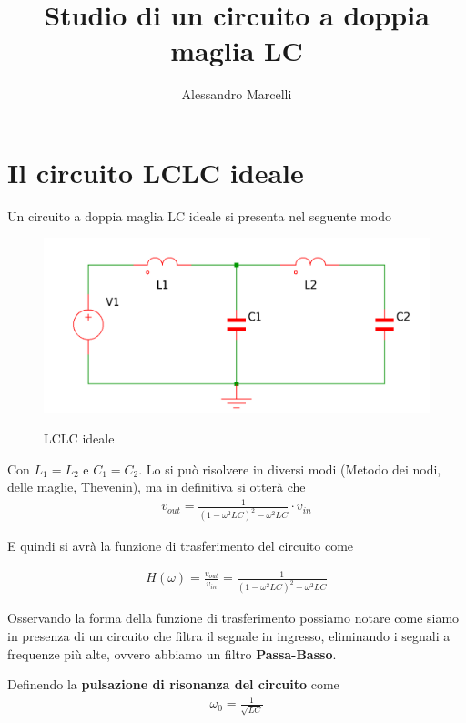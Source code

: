 \documentclass[a4paper,12pt]{report}
\title{Studio di un circuito a doppia maglia LC}
\author{Alessandro Marcelli}
\begin{document}
\maketitle
\tableofcontents
\begin{abstract}
\end{abstract}

\section{Il circuito LCLC ideale}
Un circuito a doppia maglia LC ideale si presenta nel seguente modo
\begin{figure}[!htb]
	\centering
	\includegraphics[width=\textwidth]{pictures/schemaideale.png}
	\label{fig:largenenough}
	\caption{\label{lul} \small LCLC ideale}
\end{figure}

Con $L_1 = L_2$ e $C_1 = C_2$. Lo si può risolvere in diversi modi (Metodo dei nodi, delle maglie, Thevenin), ma in definitiva si otterà che
\begin{align}
v_{out} = \frac{1}{(1 - \omega^2 LC )^2 - \omega^2LC}\cdot v_{in}
\end{align}

E quindi si avrà la funzione di trasferimento del circuito come

\begin{align}
H(\omega) = \frac{v_{out}}{v_{in}} = \frac{1}{(1 - \omega^2 LC )^2 - \omega^2LC}
\end{align}

Osservando la forma della funzione di trasferimento possiamo notare come siamo in presenza di un circuito che filtra il segnale in ingresso, eliminando i segnali a frequenze più alte, ovvero abbiamo un filtro \textbf{Passa-Basso}.

Definendo la \textbf{pulsazione di risonanza del circuito} come
\begin{align}
\omega_0 = \frac{1}{\sqrt{LC}}
\end{align}
\end{document}

